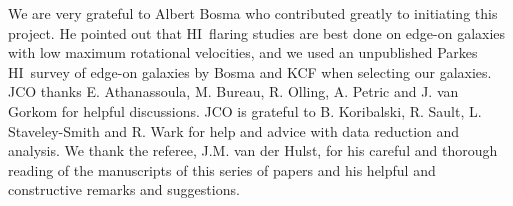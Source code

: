 \documentclass[traditabstract]{aa} %
\newcommand\HI{H{\small I}}
\begin{document}
\begin{acknowledgements}

We are very grateful to Albert Bosma who contributed greatly to
initiating this project. He pointed out that \HI\ flaring studies are
best done on edge-on galaxies with low maximum rotational velocities,
and we used an unpublished Parkes \HI\ survey of edge-on galaxies by
Bosma and KCF when selecting our galaxies.  JCO thanks E. Athanassoula,
M.  Bureau, R.  Olling, A. Petric and J. van Gorkom for helpful
discussions.  JCO is grateful to B. Koribalski, R. Sault, L.
Staveley-Smith and R.  Wark for help and advice with data reduction and
analysis.
We thank the referee, J.M. van der Hulst, for
his careful and  thorough reading of the manuscripts of this series of papers and
his helpful and constructive remarks and suggestions.



\end{acknowledgements}
\end{document}
